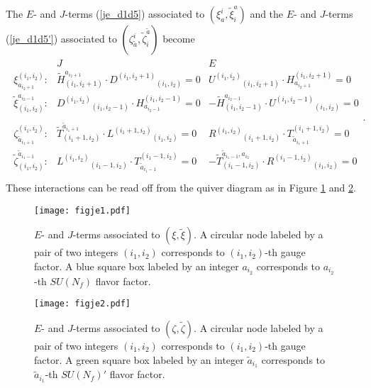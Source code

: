 \documentclass{article}
\numberwithin{equation}{section}
\begin{document}
The $E$- and $J$-terms (\ref{je_d1d5}) 
associated to $(\xi^{i}_{a}, \widetilde{\xi}^{a}_{i})$ 
and the $E$- and $J$-terms (\ref{je_d1d5'}) 
associated to $(\zeta^{i}_{\tilde{a}},\widetilde{\zeta}^{\tilde{a}}_{i})$ become
\begin{align}
\label{je_d1d5kk}
\begin{array}{lcc}
&J&E \\
\xi^{(i_{1},i_{2})}_{a_{i_{2}+1}}:&
\widetilde{H}_{(i_{1},i_{2}+1)}^{a_{i_{2}+1}}\cdot {D^{(i_{1},i_{2}+1)}}_{(i_{1},i_{2})}=0&
{U^{(i_{1},i_{2})}}_{(i_{1},i_{2}+1)}\cdot H^{(i_{1},i_{2}+1)}_{a_{i_{2}+1}}=0\\
\widetilde{\xi}_{(i_1, i_2)}^{a_{i_{2}-1}}:&
{D^{(i_1, i_2)}}_{(i_1, i_2-1)}\cdot H^{(i_{1}, i_{2}-1)}_{a_{i_{2}-1}} =0&
-\widetilde{H}_{(i_{1}, i_{2}-1)}^{a_{i_{2}-1}}\cdot {U^{(i_{1}, i_{2}-1)}}_{(i_{1},i_{2})}=0\\
&& \\
\zeta^{(i_{1},i_{2})}_{\tilde{a}_{i_{1}+1}}:&
\widetilde{T}_{(i_{1}+1, i_{2})}^{\tilde{a}_{i_{1}+1}}\cdot {L^{(i_{1}+1, i_{2})}}_{(i_{1},i_{2})} =0&
{R^{(i_{1},i_{2})}}_{(i_{1}+1, i_{2})}\cdot T^{(i_{1}+1, i_{2})}_{\tilde{a}_{i_{1}+1}}=0\\
\widetilde{\zeta}_{(i_{1}, i_{2})}^{\tilde{a}_{i_{1}-1}}:&
{L^{(i_{1}, i_{2})}}_{(i_{1}-1, i_{2})}\cdot T^{(i_{1}-1, i_{2})}_{\tilde{a}_{i_{1}-1}}=0&
-\widetilde{T}_{(i_{1}-1, i_{2})}^{\tilde{a}_{i_{1}-1}, a_{i_{2}}}\cdot {R^{(i_{1}-1,i_{2})}}_{(i_{1}, i_{2})}=0\\
\end{array}. 
\end{align}
These interactions can be read off from the quiver diagram 
as in Figure \ref{figje1} and \ref{figje2}. 
\begin{figure}
\begin{center}
\texttt{[image: figje1.pdf]}
\caption{$E$- and $J$-terms associated to $(\xi, \widetilde{\xi})$. 
A circular node labeled by a pair of two integers $(i_{1}, i_{2})$ 
corresponds to $(i_{1}, i_{2})$-th gauge factor. 
A blue square box labeled by an integer $a_{i_{2}}$ 
corresponds to $a_{i_{2}}$-th $SU(N_{f})$ flavor factor. }
\label{figje1}
\end{center}
\end{figure}
\begin{figure}
\begin{center}
\texttt{[image: figje2.pdf]}
\caption{$E$- and $J$-terms associated to $(\zeta,\widetilde{\zeta})$. 
A circular node labeled by a pair of two integers $(i_{1}, i_{2})$ 
corresponds to $(i_{1}, i_{2})$-th gauge factor. 
A green square box labeled by an integer $\tilde{a}_{i_{1}}$ 
corresponds to $\tilde{a}_{i_{1}}$-th $SU(N_{f})'$ flavor factor. }
\label{figje2}
\end{center}
\end{figure}
\end{document}
